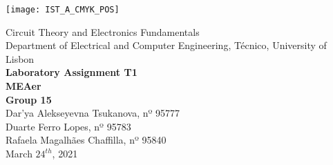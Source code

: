 
\thispagestyle {empty}

\texttt{[image: IST\_A\_CMYK\_POS]}

\begin{center}
%
\vspace{1.0cm}

\vspace{1cm}
{\FontLb Circuit Theory and Electronics Fundamentals} \\ %
\vspace{1cm}
{\FontSn Department of Electrical and Computer Engineering, Técnico, University of Lisbon} \\ %
\vspace{1cm}
{\FontSn \textbf{Laboratory Assignment T1}} \\
\vspace{1cm}
{\FontSn \textbf{MEAer}} \\ %
\vspace{1cm}
{\FontSn \textbf{Group 15}} \\
\vspace{.5cm}
{\FontSn Dar'ya Alekseyevna Tsukanova, nº 95777} \\
{\FontSn Duarte Ferro Lopes, nº 95783} \\
{\FontSn Rafaela Magalhães Chaffilla, nº 95840} \\
\vspace{1cm}
{\FontSn March $24^{th}$, 2021} \\ %
%
\end{center}

